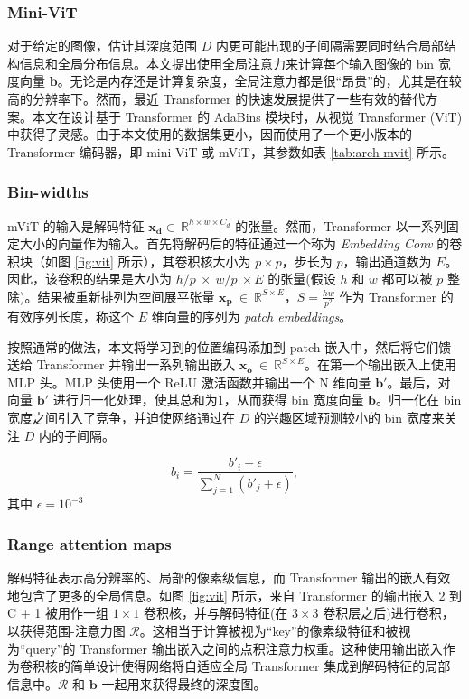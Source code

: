 \documentclass{vip-theme}
\begin{document}
\subsubsection{Mini-ViT}

对于给定的图像，估计其深度范围 $D$ 内更可能出现的子间隔需要同时结合局部结构信息和全局分布信息。本文提出使用全局注意力来计算每个输入图像的 bin 宽度向量 $\textbf{b}$。无论是内存还是计算复杂度，全局注意力都是很“昂贵”的，尤其是在较高的分辨率下。然而，最近 Transformer 的快速发展提供了一些有效的替代方案。本文在设计基于 Transformer 的 AdaBins 模块时，从视觉 Transformer (ViT) 中获得了灵感。由于本文使用的数据集更小，因而使用了一个更小版本的 Transformer 编码器，即 mini-ViT 或 mViT，其参数如表 \ref{tab:arch-mvit} 所示。

\subsubsection{Bin-widths}

mViT 的输入是解码特征 $\mathbf{x_d}\in~\mathbb{R}^{h \times w \times C_d}$ 的张量。然而，Transformer 以一系列固定大小的向量作为输入。首先将解码后的特征通过一个称为 \textit{Embedding Conv} 的卷积块（如图 \ref{fig:vit} 所示），其卷积核大小为 $p\times p$，步长为 $p$，输出通道数为 $E$。因此，该卷积的结果是大小为 $h/p~\times~w/p~\times E$ 的张量(假设 $h$ 和 $w$ 都可以被 $p$ 整除)。结果被重新排列为空间展平张量 $\mathbf{x_p}~\in~\mathbb{R}^{S\times E}$，$S=\frac{hw}{p^2}$ 作为 Transformer 的有效序列长度，称这个 $E$ 维向量的序列为 \textit{patch embeddings}。

按照通常的做法，本文将学习到的位置编码添加到 patch 嵌入中，然后将它们馈送给 Transformer 并输出一系列输出嵌入 $\mathbf{x_o}~\in~\mathbb{R}^{S\times E}$。在第一个输出嵌入上使用 MLP 头。MLP 头使用一个 ReLU 激活函数并输出一个 N 维向量 $\textbf{b}'$。最后，对向量 $\textbf{b}'$ 进行归一化处理，使其总和为1，从而获得 bin 宽度向量 $\textbf{b}$。归一化在 bin 宽度之间引入了竞争，并迫使网络通过在 $D$ 的兴趣区域预测较小的 bin 宽度来关注 $D$ 内的子间隔。

\begin{equation}
    b_i = \frac{b'_i + \epsilon}{\sum_{j=1}^{N} (b'_j + \epsilon)},
\end{equation}
其中 $\epsilon=10^{-3}$

\subsubsection{Range attention maps}

解码特征表示高分辨率的、局部的像素级信息，而 Transformer 输出的嵌入有效地包含了更多的全局信息。如图 \ref{fig:vit} 所示，来自 Transformer 的输出嵌入 2 到 C + 1 被用作一组 $1 \times 1$ 卷积核，并与解码特征(在 $3\times 3$ 卷积层之后)进行卷积，以获得范围-注意力图 $\mathcal{R}$。这相当于计算被视为“key”的像素级特征和被视为“query”的 Transformer 输出嵌入之间的点积注意力权重。这种使用输出嵌入作为卷积核的简单设计使得网络将自适应全局 Transformer 集成到解码特征的局部信息中。$\mathcal{R}$ 和 $\textbf{b}$ 一起用来获得最终的深度图。
\end{document}
